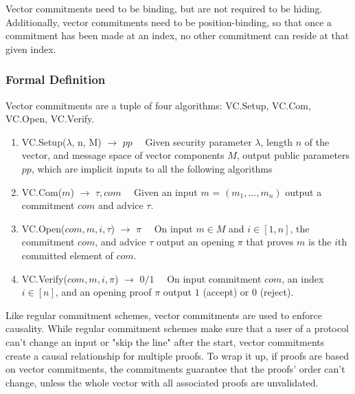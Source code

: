 Vector commitments need to be binding, but are not required to be hiding. Additionally, vector commitments need to be position-binding, so that once a commitment has been made at an index, no other commitment can reside at that given index.

\subsubsection{Formal Definition}
Vector commitments are a tuple of four algorithms: VC.Setup, VC.Com, VC.Open, VC.Verify.~\cite{Boneh2019-tk}

\begin{enumerate}

  \item VC.Setup(\(\lambda\), n, M) \(\rightarrow\) \(pp\quad\) Given security parameter \(\lambda\), length \(n\) of the vector, and message space of vector components \(M\), output public parameters \(pp\), which are implicit inputs to all the following algorithms

  \item VC.Com(\(m\)) \(\rightarrow\) \(\tau, com\quad\) Given an input \(m\) = \((m_1, ..., m_n)\) output a commitment \(com\) and advice \(\tau\).

  \item VC.Open(\(com, m, i, \tau\)) \(\rightarrow\) \(\pi\quad\) On input \(m \in M\) and \(i \in [1, n]\), the commitment \(com\), and advice \(\tau\) output an opening \(\pi\) that proves \(m\) is the \(i\)th committed element of \(com\).

  \item VC.Verify(\(com, m, i, \pi\)) \(\rightarrow\) \(0/1\quad\) On input commitment \(com\), an index \(i \in [n]\), and an opening proof \(\pi\) output \(1\) (accept) or \(0\) (reject).

\end{enumerate}

Like regular commitment schemes, vector commitments are used to enforce causality. While regular commitment schemes make sure that a user of a protocol can't change an input or "skip the line" after the start, vector commitments create a causal relationship for multiple proofs. To wrap it up, if proofs are based on vector commitments, the commitments guarantee that the proofs' order can't change, unless the whole vector with all associated proofs are unvalidated.

